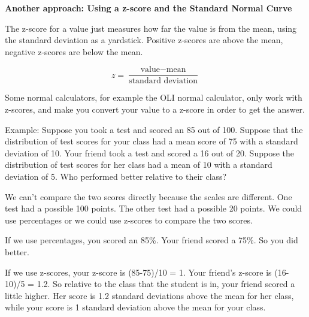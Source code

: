 \textbf{Another approach: Using a z-score and the Standard Normal Curve}

The z-score for a value just measures how far the value is from the mean, using the standard deviation as a yardstick. Positive z-scores are above the mean, negative z-scores are below the mean.

\[z=\displaystyle\frac{\mbox{value}-\mbox{mean}}{\mbox{standard deviation}}\]

Some normal calculators, for example the OLI normal calculator, only work with z-scores, and make you convert your value to a z-score in order to get the answer.

Example: Suppose you took a test and scored an 85 out of 100. Suppose that the distribution of test scores for your class had a mean score of 75 with a standard deviation of 10. Your friend took a test and scored a 16 out of 20. Suppose the distribution of test scores for her class had a mean of 10 with a standard deviation of 5. Who performed better relative to their class?

We can't compare the two scores directly because the scales are different. One test had a possible 100 points. The other test had a possible 20 points. We could use percentages or we could use z-scores to compare the two scores.
 
If we use percentages, you scored an 85\%. Your friend scored a 75\%. So you did better.

If we use z-scores, your z-score is (85-75)/10 = 1. Your friend's z-score is (16-10)/5 = 1.2. So relative to the class that the student is in, your friend scored a little higher. Her score is 1.2 standard deviations above the mean for her class, while your score is 1 standard deviation above the mean for your class.


